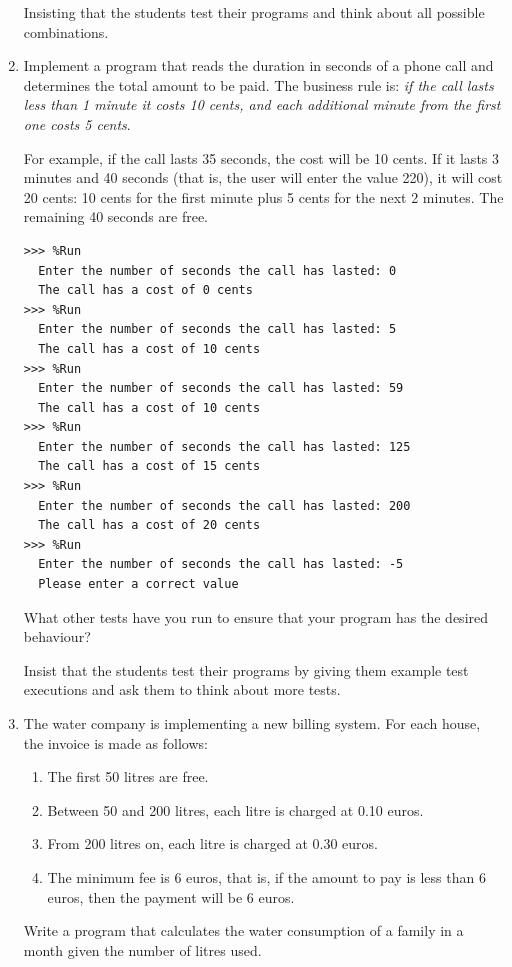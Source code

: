 \documentclass[
  fontsize=10pt,
  a4paper,
]{scrartcl}
\newenvironment{howTILEd}%
  {\begin{mdframed}[skipabove=10pt,skipbelow=10pt,backgroundcolor=pink!40]}%
  {\end{mdframed}}
\begin{document}
\begin{enumerate}
\begin{howTILEd}
Insisting that the students test their programs and think about all possible combinations.
\end{howTILEd}


\item Implement a program that reads the duration in seconds of a phone call and determines the total amount to be paid. The business rule is: {\em if the call lasts less than 1 minute it costs 10 cents, and each additional minute from the first one costs 5 cents}. 

For example, if the call lasts 35 seconds, the cost will be 10 cents. If it lasts 3 minutes and 40 seconds (that is, the user will enter the value 220), it will cost 20 cents: 10 cents for the first minute plus 5 cents for the next 2 minutes. The remaining 40 seconds are free.

\begin{small}
\begin{Verbatim}[frame=single, label={\em examples of test executions}]
>>> %Run 
  Enter the number of seconds the call has lasted: 0
  The call has a cost of 0 cents
>>> %Run 
  Enter the number of seconds the call has lasted: 5
  The call has a cost of 10 cents
>>> %Run 
  Enter the number of seconds the call has lasted: 59
  The call has a cost of 10 cents
>>> %Run 
  Enter the number of seconds the call has lasted: 125
  The call has a cost of 15 cents
>>> %Run 
  Enter the number of seconds the call has lasted: 200
  The call has a cost of 20 cents
>>> %Run 
  Enter the number of seconds the call has lasted: -5
  Please enter a correct value
\end{Verbatim}
\end{small}

What other tests have you run to ensure that your program has the desired behaviour?


\begin{howTILEd}
Insist that the students test their programs by giving them example test executions and ask them to think about more tests.
\end{howTILEd}

\item The water company is implementing a new billing system. For each house, the invoice is made as follows: 
\begin{enumerate}
\item The first 50 litres are free.
\item Between 50 and 200 litres, each litre is charged at 0.10 euros.
\item From 200 litres on, each litre is charged at 0.30 euros.
\item The minimum fee is 6 euros, that is, if the amount to pay is less than 6 euros, then the payment will be 6 euros.
\end{enumerate}
Write a program that calculates the water consumption of a family in a month given the number of litres used.


\end{enumerate}
\end{document}
